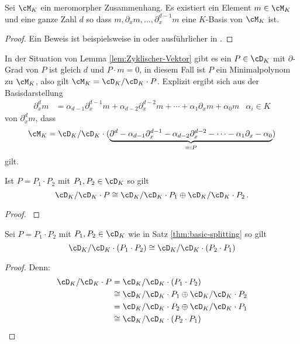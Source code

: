 \begin{lem} \label{lem:Zyklischer-Vektor}
Sei $\cM_K$ ein meromorpher Zusammenhang. Es existiert ein Element
$m\in\cM_K$ und eine ganze Zahl $d$ so dass
$m,\partial_xm,\dots,\partial_x^{d-1}m$ eine $K$-Basis von $\cM_K$ ist.
\end{lem}
\begin{proof}
Ein Beweis ist beispielsweise in \cite[Thm 4.3.3]{sabbah_cimpa90} oder
ausführlicher in \cite[Satz 4.8]{ZulaBarbara}.
\end{proof}
\begin{cor} \label{cor:Zyklischer-Vektor}
In der Situation von Lemma \ref{lem:Zyklischer-Vektor} gibt es ein $P\in
\cD_K$ mit $\partial$-Grad von $P$ ist gleich $d$ und $P \cdot m=0$, in
diesem Fall ist $P$ ein Minimalpolynom zu $\cM_K$, also gilt
$\cM_K=\cD_K/\cD_K\cdot P$. Explizit ergibt sich aus der Basisdarstellung
\begin{align*}
\partial_x^d m&= \alpha_{d-1}\partial_x^{d-1}m + \alpha_{d-2}\partial_x^{d-2}m
  + \cdots + \alpha_1\partial_xm + \alpha_0m & \alpha_i\in K
\end{align*}
von $\partial_x^d m$, dass
\[
\cM_K=\cD_K/\cD_K\cdot( \underset{=:P}{\underbrace{
  \partial^d - \alpha_{d-1}\partial_x^{d-1} - \alpha_{d-2}\partial_x^{d-2} -
  \cdots - \alpha_1\partial_x - \alpha_0 }} )
\]
gilt.
\end{cor}

\begin{thm}\label{thm:basic-splitting}
\cite[Seite 64]{ZulaBarbara} %
Ist $P=P_1\cdot P_2$ mit $P_1,P_2\in \cD_K$ so gilt
\[
\cD_K/\cD_K\cdot P \cong \cD_K/\cD_K\cdot P_1 \oplus \cD_K/\cD_K\cdot P_2 \,.
\]
\end{thm}
\begin{proof}
\cite[Seite 57-64]{ZulaBarbara}
\end{proof}
\begin{cor}
Sei $P=P_1\cdot P_2$ mit $P_1,P_2\in \cD_K$ wie in Satz
\ref{thm:basic-splitting} so gilt
\[
\cD_K/\cD_K\cdot (P_1\cdot P_2) \cong \cD_K/\cD_K\cdot (P_2 \cdot P_1)
\]
\end{cor}
\begin{proof} Denn:
\begin{align*}
\cD_K/\cD_K\cdot P &= \cD_K/\cD_K\cdot (P_1\cdot P_2)\\
  &\cong \cD_K/\cD_K\cdot P_1 \oplus \cD_K/\cD_K\cdot P_2\\
  &= \cD_K/\cD_K\cdot P_2 \oplus \cD_K/\cD_K\cdot P_1\\
  &\cong \cD_K/\cD_K\cdot (P_2 \cdot P_1)
\end{align*}
\end{proof}

